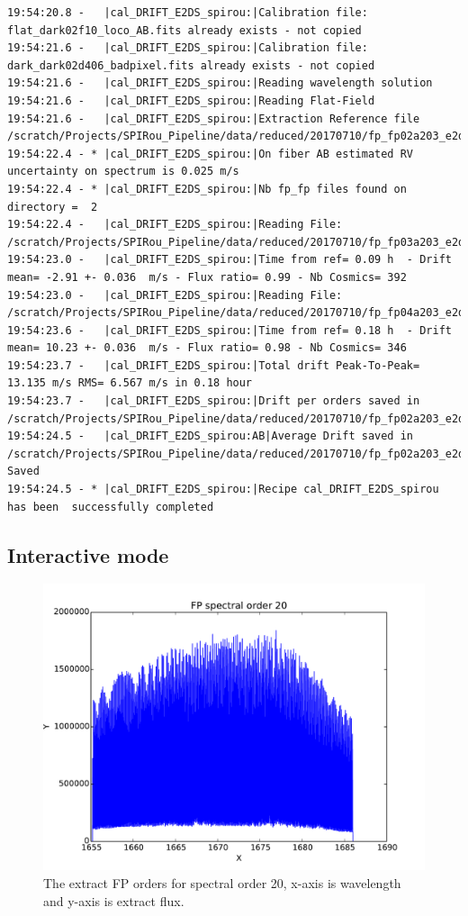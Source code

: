 \begin{lstlisting}[style=text]
19:54:20.8 -   |cal_DRIFT_E2DS_spirou:|Calibration file: flat_dark02f10_loco_AB.fits already exists - not copied
19:54:21.6 -   |cal_DRIFT_E2DS_spirou:|Calibration file: dark_dark02d406_badpixel.fits already exists - not copied
19:54:21.6 -   |cal_DRIFT_E2DS_spirou:|Reading wavelength solution
19:54:21.6 -   |cal_DRIFT_E2DS_spirou:|Reading Flat-Field
19:54:21.6 -   |cal_DRIFT_E2DS_spirou:|Extraction Reference file  /scratch/Projects/SPIRou_Pipeline/data/reduced/20170710/fp_fp02a203_e2ds_AB.fits
19:54:22.4 - * |cal_DRIFT_E2DS_spirou:|On fiber AB estimated RV uncertainty on spectrum is 0.025 m/s
19:54:22.4 - * |cal_DRIFT_E2DS_spirou:|Nb fp_fp files found on directory =  2
19:54:22.4 -   |cal_DRIFT_E2DS_spirou:|Reading File: /scratch/Projects/SPIRou_Pipeline/data/reduced/20170710/fp_fp03a203_e2ds_AB.fits
19:54:23.0 -   |cal_DRIFT_E2DS_spirou:|Time from ref= 0.09 h  - Drift mean= -2.91 +- 0.036  m/s - Flux ratio= 0.99 - Nb Cosmics= 392
19:54:23.0 -   |cal_DRIFT_E2DS_spirou:|Reading File: /scratch/Projects/SPIRou_Pipeline/data/reduced/20170710/fp_fp04a203_e2ds_AB.fits
19:54:23.6 -   |cal_DRIFT_E2DS_spirou:|Time from ref= 0.18 h  - Drift mean= 10.23 +- 0.036  m/s - Flux ratio= 0.98 - Nb Cosmics= 346
19:54:23.7 -   |cal_DRIFT_E2DS_spirou:|Total drift Peak-To-Peak= 13.135 m/s RMS= 6.567 m/s in 0.18 hour
19:54:23.7 -   |cal_DRIFT_E2DS_spirou:|Drift per orders saved in /scratch/Projects/SPIRou_Pipeline/data/reduced/20170710/fp_fp02a203_e2ds_AB_drift.fits
19:54:24.5 -   |cal_DRIFT_E2DS_spirou:AB|Average Drift saved in /scratch/Projects/SPIRou_Pipeline/data/reduced/20170710/fp_fp02a203_e2ds_AB_drift.tbl Saved
19:54:24.5 - * |cal_DRIFT_E2DS_spirou:|Recipe cal_DRIFT_E2DS_spirou has been  successfully completed

\end{lstlisting}


\subsection{Interactive mode}

\begin{figure}
\begin{center}
\includegraphics[width=.8\textwidth]{figures/cal_DRIFT_E2DS_spirou_1.pdf}
\caption{The extract FP orders for spectral order 20, x-axis is wavelength and y-axis is extract flux. \label{figure_cal_drift_e2ds_spirou_1}}
\end{center}
\end{figure}

